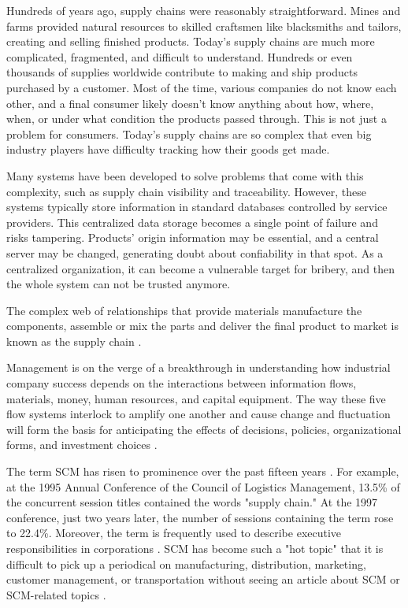 
\acresetall 

Hundreds of years ago, supply chains were reasonably straightforward. Mines and farms provided natural resources to skilled craftsmen like blacksmiths and tailors, creating and selling finished products. Today's supply chains are much more complicated, fragmented, and difficult to understand. Hundreds or even thousands of supplies worldwide contribute to making and ship products purchased by a customer. Most of the time, various companies do not know each other, and a final consumer likely doesn't know anything about how, where, when, or under what condition the products passed through. This is not just a problem for consumers. Today's supply chains are so complex that even big industry players have difficulty tracking how their goods get made.

Many systems have been developed to solve problems that come with this complexity, such as supply chain visibility and traceability. However, these systems typically store information in standard databases controlled by service providers. This centralized data storage becomes a single point of failure and risks tampering. Products' origin information may be essential, and a central server may be changed, generating doubt about confiability in that spot. As a centralized organization, it can become a vulnerable target for bribery, and then the whole system can not be trusted anymore.

The complex web of relationships that provide materials manufacture the components, assemble or mix the parts and deliver the final product to market is known as the supply chain \cite{buurman2002supply}.

Management is on the verge of a breakthrough in understanding how industrial company success depends on the interactions between information flows, materials, money, human resources, and capital equipment. The way these five flow systems interlock to amplify one another and cause change and fluctuation will form the basis for anticipating the effects of decisions, policies, organizational forms, and investment choices \cite{forrester1958industrial}.

The term \ac{SCM} has risen to prominence over the past fifteen years \cite{cooper1997supply}. For example, at the 1995 Annual Conference of the Council of Logistics Management, 13.5\% of the concurrent session titles contained the words "supply chain." At the 1997 conference, just two years later, the number of sessions containing the term rose to 22.4\%. Moreover, the term is frequently used to describe executive responsibilities in corporations \cite{la1997supply}. SCM has become such a "hot topic" that it is difficult to pick up a periodical on manufacturing, distribution, marketing, customer management, or transportation without seeing an article about SCM or SCM-related topics \cite{ross1997competing}.

